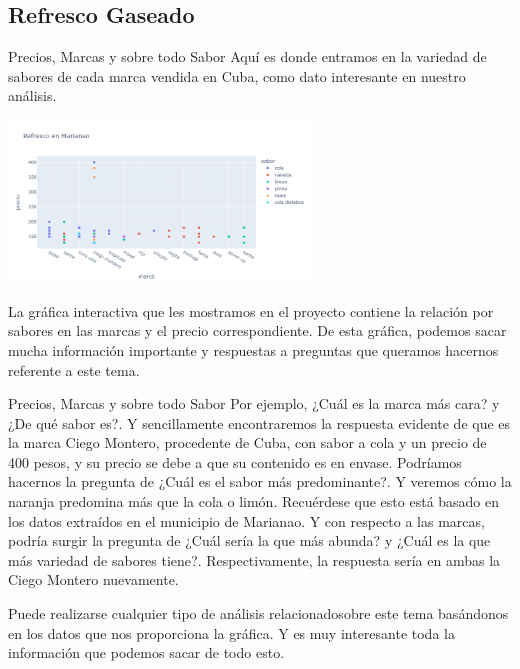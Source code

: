 \subsection{Refresco Gaseado}
\begin{frame}[fragile]{Precios, Marcas y sobre todo Sabor}
  Aquí es donde entramos en la variedad de sabores de cada marca vendida en Cuba, como dato interesante en nuestro análisis.
  \begin{center}
    \includegraphics[width=8cm]{refresco1.png}
  \end{center}
  La gráfica interactiva que les mostramos en el proyecto contiene la relación por sabores en las marcas y el precio correspondiente. 
  De esta gráfica, podemos sacar mucha información importante y respuestas a preguntas que queramos hacernos referente a este tema. 
\end{frame}

\begin{frame}[fragile]{Precios, Marcas y sobre todo Sabor}
  Por ejemplo, ¿Cuál es la marca más cara? y ¿De qué sabor es?. 
  Y sencillamente encontraremos la respuesta evidente de que es la marca Ciego Montero, procedente de Cuba, con sabor a cola y un precio de 400 pesos, y su precio se debe a que su contenido es en envase. 
  Podríamos hacernos la pregunta de ¿Cuál es el sabor más predominante?. 
  Y veremos cómo la naranja predomina más que la cola o limón. 
  Recuérdese que esto está basado en los datos extraídos en el municipio de Marianao. 
  Y con respecto a las marcas, podría surgir la pregunta de ¿Cuál sería la que más abunda? y ¿Cuál es la que más variedad de sabores tiene?. 
  Respectivamente, la respuesta sería en ambas la Ciego Montero nuevamente.

  Puede realizarse cualquier tipo de análisis relacionadosobre este tema basándonos en los datos que nos proporciona la gráfica. 
  Y es muy interesante toda la información que podemos sacar de todo esto.
\end{frame}

